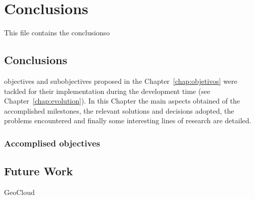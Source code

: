 \chapter{Conclusions}
\label{chap:conclusions}
This file contains the conclusionso

\section{Conclusions}

 objectives and subobjectives proposed in the
Chapter~\ref{chap:objetivos} were tackled for their implementation during the
development time (see Chapter~\ref{chap:evolution}). In this Chapter the main
aspects obtained of the accomplished milestones, the relevant solutions and
decisions adopted, the problems encountered and finally some interesting lines
of research are detailed.

\subsection{Accomplised objectives}



\section{Future Work}

GeoCloud 


